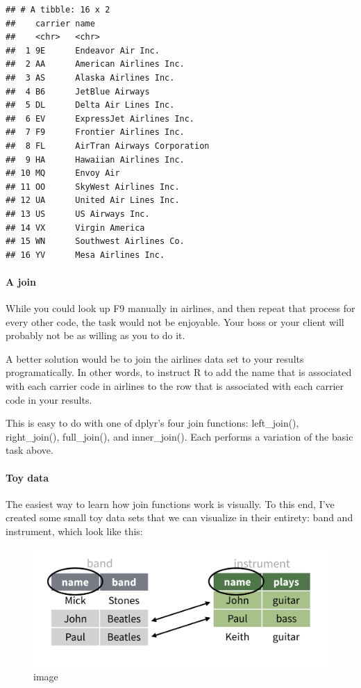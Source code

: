 \documentclass[
]{article}
\begin{document}
\begin{verbatim}
## # A tibble: 16 x 2
##    carrier name                       
##    <chr>   <chr>                      
##  1 9E      Endeavor Air Inc.          
##  2 AA      American Airlines Inc.     
##  3 AS      Alaska Airlines Inc.       
##  4 B6      JetBlue Airways            
##  5 DL      Delta Air Lines Inc.       
##  6 EV      ExpressJet Airlines Inc.   
##  7 F9      Frontier Airlines Inc.     
##  8 FL      AirTran Airways Corporation
##  9 HA      Hawaiian Airlines Inc.     
## 10 MQ      Envoy Air                  
## 11 OO      SkyWest Airlines Inc.      
## 12 UA      United Air Lines Inc.      
## 13 US      US Airways Inc.            
## 14 VX      Virgin America             
## 15 WN      Southwest Airlines Co.     
## 16 YV      Mesa Airlines Inc.
\end{verbatim}

\hypertarget{a-join}{%
\paragraph{A join}\label{a-join}}

While you could look up F9 manually in airlines, and then repeat that
process for every other code, the task would not be enjoyable. Your boss
or your client will probably not be as willing as you to do it.

A better solution would be to join the airlines data set to your results
programatically. In other words, to instruct R to add the name that is
associated with each carrier code in airlines to the row that is
associated with each carrier code in your results.

This is easy to do with one of dplyr's four join functions:
left\_join(), right\_join(), full\_join(), and inner\_join(). Each
performs a variation of the basic task above.

\hypertarget{toy-data}{%
\paragraph{Toy data}\label{toy-data}}

The easiest way to learn how join functions work is visually. To this
end, I've created some small toy data sets that we can visualize in
their entirety: band and instrument, which look like this:

\begin{figure}
\centering
\includegraphics{data/instrument.png}
\caption{image}
\end{figure}
\end{document}
